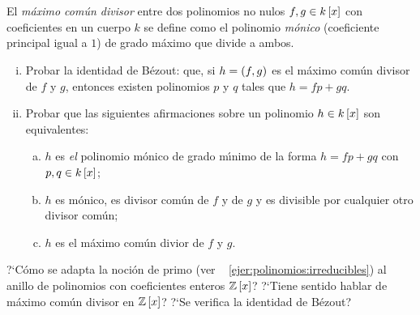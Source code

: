 \begin{ejerPolinomios}\label{ejer:polinomios;mcd}
	El \emph{m\'aximo com\'un divisor} entre dos polinomios no nulos
	$f,g\in\polinomios[x] k$ con coeficientes en un cuerpo $k$ se define
	como el polinomio \emph{m\'onico} (coeficiente principal igual a $1$)
	de grado m\'aximo que divide a ambos.
	\begin{enumerate}[(i)]
		\item\label{ejer:polinomios:mcd:bezout}
			Probar la identidad de B\'ezout: que, si $h=\mcd{f,g}$
			es el m\'aximo com\'un divisor de $f$ y $g$, entonces
			existen polinomios $p$ y $q$ tales que $h=fp+gq$.
		\item\label{ejer:polinomios:mcd:equivalencias}
			Probar que las siguientes afirmaciones sobre un
			polinomio $h\in\polinomios[x] k$ son equivalentes:
			\begin{enumerate}[(a)]
				\item\label{ejer:polinomios:mcd:a}
					$h$ es \emph{el} polinomio m\'onico
					de grado m\'{\i}nimo de la forma
					$h=fp+gq$ con $p,q\in\polinomios[x] k$;
				\item\label{ejer:polinomios:mcd:b}
					$h$ es m\'onico, es divisor com\'un
					de $f$ y de $g$ y es divisible por
					cualquier otro divisor com\'un;
				\item\label{ejer:polinomios:mcd:c}
					$h$ es el m\'aximo com\'un divior
					de $f$ y $g$.
			\end{enumerate}
	\end{enumerate}
\end{ejerPolinomios}

\begin{ejerPolinomios}\label{ejer:polinomios:enteros}
	?`C\'omo se adapta la noci\'on de primo (ver \ejername~%
	\ref{ejer:polinomios:irreducibles}) al anillo de polinomios con
	coeficientes enteros $\polinomios[x]\Enteros$?
	?`Tiene sentido hablar de m\'aximo com\'un divisor en
	$\polinomios[x] \Enteros$? ?`Se verifica la identidad de B\'ezout?
\end{ejerPolinomios}

